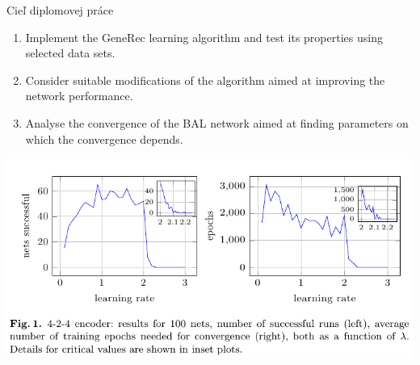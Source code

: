 \documentclass[xcolor=dvipsnames]{beamer}
\begin{document}

\begin{frame}{Cieľ diplomovej práce} 
  \begin{enumerate} 
    \item Implement the GeneRec learning algorithm and test its properties using
    selected data sets.
    \item Consider suitable modifications of the algorithm aimed at improving the
    network performance.
    \item Analyse the convergence of the BAL network aimed at finding parameters on which the convergence depends. 
  \end{enumerate} 
  
  \begin{center}
    \includegraphics[scale=0.40]{img/bal_performance.png}
  \end{center}  
  
\end{frame} 

\end{document}
